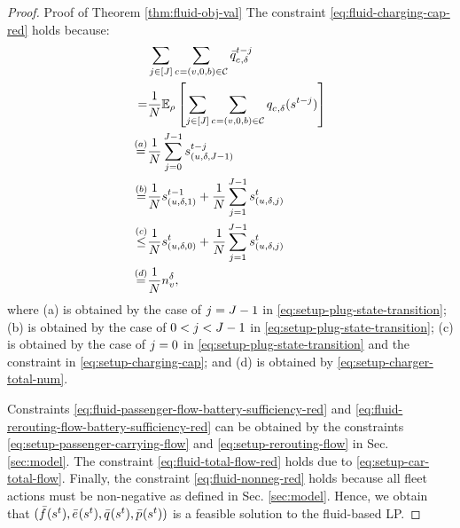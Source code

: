 \begin{proof}{Proof of Theorem \ref{thm:fluid-obj-val}}
    The constraint \eqref{eq:fluid-charging-cap-red} holds because:
    \begin{align*}
        &\sum_{\plugremaintime \in [\chargetime]} \sum_{\cartype{} = (\region, 0, \battery) \in \Cartype} \lpcharge{\cartype{}, \type}{t-\plugremaintime} \\
        =& \frac{1}{\Size} \mathbb{E}_{\rho} \left[\sum_{\plugremaintime \in [\chargetime]} \sum_{\cartype{} = (\region, 0, \battery) \in \Cartype} \jointchargingaction{\cartype{}, \type}{}(s^{t-\plugremaintime})\right] \\
        \stackrel{(a)}{=}& \frac{1}{\Size} \sum_{\plugremaintime = 0}^{\chargetime - 1} s_{(\origin, \type, \chargetime - 1)}^{t - \plugremaintime}\\
        \stackrel{(b)}{=}& \frac{1}{\Size} s_{(\origin, \type, 1)}^{t-1} + \frac{1}{\Size} \sum_{\plugremaintime = 1}^{\chargetime - 1} s_{(\origin, \type, \plugremaintime)}^{t}\\
        \stackrel{(c)}{\leq}& \frac{1}{\Size} s_{(\origin, \type, 0)}^{t} + \frac{1}{\Size} \sum_{\plugremaintime = 1}^{\chargetime - 1} s_{(\origin, \type, \plugremaintime)}^{t}\\
        \stackrel{(d)}{=}& \frac{1}{\Size} \n{\region}{\type},
    \end{align*}
    where (a) is obtained by the case of $\plugremaintime = \chargetime - 1$ in \eqref{eq:setup-plug-state-transition}; (b) is obtained by the case of $0 < \plugremaintime < \chargetime - 1$ in \eqref{eq:setup-plug-state-transition}; (c) is obtained by the case of $\plugremaintime = 0$ in \eqref{eq:setup-plug-state-transition} and the constraint in \eqref{eq:setup-charging-cap}; and (d) is obtained by \eqref{eq:setup-charger-total-num}.

    Constraints \eqref{eq:fluid-passenger-flow-battery-sufficiency-red} and \eqref{eq:fluid-rerouting-flow-battery-sufficiency-red} can be obtained by the constraints \eqref{eq:setup-passenger-carrying-flow} and \eqref{eq:setup-rerouting-flow} in Sec. \ref{sec:model}. The constraint \eqref{eq:fluid-total-flow-red} holds due to \eqref{eq:setup-car-total-flow}. Finally, the constraint \eqref{eq:fluid-nonneg-red} holds because all fleet actions must be non-negative as defined in Sec. \ref{sec:model}. Hence, we obtain that $(\lptripfulfill{}{}(s^t), \lpreroute{}{}(s^t), \lpcharge{}{}(s^t), \lppass{}{}(s^t))$ is a feasible solution to the fluid-based LP.
    

\end{proof}
